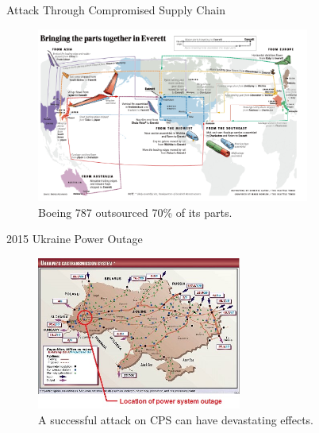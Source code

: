 \documentclass[10pt]{beamer}
\begin{document}
\begin{frame}{Attack Through Compromised Supply Chain}
  \begin{figure}[ht]
    \centering
    \includegraphics[width=0.8\textwidth]{boeing.jpg}
    \caption{Boeing 787 outsourced 70\% of its parts.}
  \end{figure}
\end{frame}

\begin{frame}{2015 Ukraine Power Outage}
  \begin{figure}[<+htpb+>]
    \begin{center}
      \includegraphics[width=0.60\textwidth]{ukraine.jpg}
      \caption{A successful attack on CPS can have devastating effects.}
    \end{center}
  \end{figure}
\end{frame}
\end{document}
